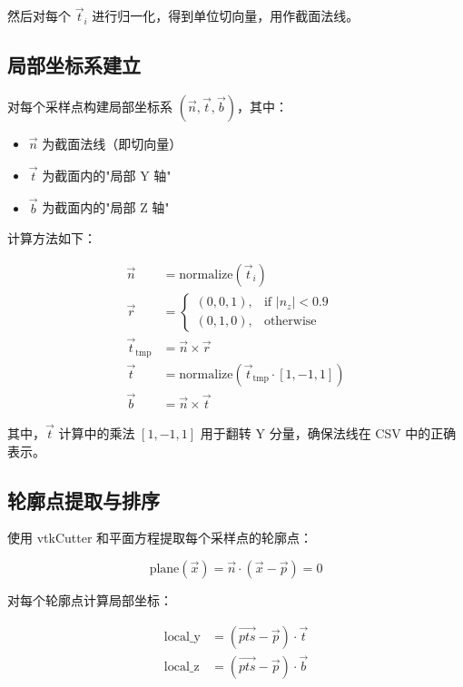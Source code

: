 \documentclass[12pt,a4paper]{article}
\begin{document}
然后对每个 $\vec{t}_i$ 进行归一化，得到单位切向量，用作截面法线。

\subsection{局部坐标系建立}

对每个采样点构建局部坐标系 $(\vec{n}, \vec{t}, \vec{b})$，其中：

\begin{itemize}
  \item $\vec{n}$ 为截面法线（即切向量）
  \item $\vec{t}$ 为截面内的"局部 Y 轴"
  \item $\vec{b}$ 为截面内的"局部 Z 轴"
\end{itemize}

计算方法如下：

\begin{align}
\vec{n} &= \text{normalize}(\vec{t}_i) \\
\vec{r} &= 
\begin{cases}
(0,0,1), & \text{if } |n_z| < 0.9 \\
(0,1,0), & \text{otherwise}
\end{cases} \\
\vec{t}_{\text{tmp}} &= \vec{n} \times \vec{r} \\
\vec{t} &= \text{normalize}(\vec{t}_{\text{tmp}} \cdot [1, -1, 1]) \\
\vec{b} &= \vec{n} \times \vec{t}
\end{align}

其中，$\vec{t}$ 计算中的乘法 $[1, -1, 1]$ 用于翻转 Y 分量，确保法线在 CSV 中的正确表示。

\subsection{轮廓点提取与排序}

使用 vtkCutter 和平面方程提取每个采样点的轮廓点：

\begin{equation}
\text{plane}(\vec{x}) = \vec{n} \cdot (\vec{x} - \vec{p}) = 0
\end{equation}

对每个轮廓点计算局部坐标：

\begin{align}
\text{local\_y} &= (\vec{pts} - \vec{p}) \cdot \vec{t} \\
\text{local\_z} &= (\vec{pts} - \vec{p}) \cdot \vec{b}
\end{align}
\end{document}
